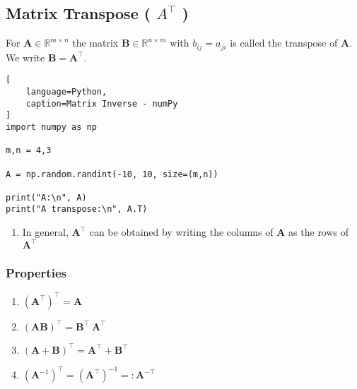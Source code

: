 \subsection{Matrix Transpose ( $A^{\top}$ ) \cite{mfml/book/mml/Deisenroth-Faisal-Ong}}

For $\bm{A} \in \mathbb{R}^{m\times n}$ the matrix $\bm{B} \in \mathbb{R}^{n\times m}$ with $b_{ij} = a_{ji}$ is called the transpose of $\bm{A}$. 
We write $\bm{B} = \bm{A}^\top$.
\hfill \cite{mfml/book/mml/Deisenroth-Faisal-Ong}






\begin{lstlisting}[
    language=Python,
    caption=Matrix Inverse - numPy
]
import numpy as np

m,n = 4,3

A = np.random.randint(-10, 10, size=(m,n))

print("A:\n", A)
print("A transpose:\n", A.T)
\end{lstlisting}







\begin{enumerate}
    \item In general, $\bm{A}^\top$ can be obtained by writing the columns of $\bm{A}$ as the rows of $\bm{A}^\top$
    \hfill \cite{mfml/book/mml/Deisenroth-Faisal-Ong}
\end{enumerate}



\subsubsection{Properties}

\begin{multicols}{2}
\begin{enumerate}
    \item $(\bm{A}^\top)^\top = \bm{A}$
    \hfill \cite{mfml/book/mml/Deisenroth-Faisal-Ong}

    \item $(\bm{AB})^\top = \bm{B}^\top\ \bm{A}^\top$
    \hfill \cite{mfml/book/mml/Deisenroth-Faisal-Ong}

    \item $(\bm{A}+\bm{B})^\top = \bm{A}^\top + \bm{B}^\top$
    \hfill \cite{mfml/book/mml/Deisenroth-Faisal-Ong}

    \item $(\bm{A}^{-1})^\top = (\bm{A}^\top)^{-1} =: \bm{A}^{-\top}$
    \hfill \cite{mfml/book/mml/Deisenroth-Faisal-Ong}

\end{enumerate}
\end{multicols}







